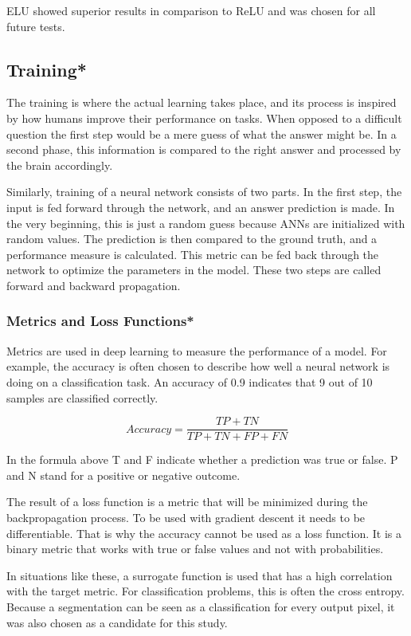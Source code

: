 ELU showed superior results in comparison to ReLU and was chosen for all future tests.

\subsection{Training*}

The training is where the actual learning takes place, and its process is inspired by how humans improve their performance on tasks. When opposed to a difficult question the first step would be a mere guess of what the answer might be. In a second phase, this information is compared to the right answer and processed by the brain accordingly.

Similarly, training of a neural network consists of two parts. In the first step, the input is fed forward through the network, and an answer prediction is made. In the very beginning, this is just a random guess because ANNs are initialized with random values. The prediction is then compared to the ground truth, and a performance measure is calculated. This metric can be fed back through the network to optimize the parameters in the model. These two steps are called forward and backward propagation.

\subsubsection{Metrics and Loss Functions*}

Metrics are used in deep learning to measure the performance of a model. For example, the accuracy is often chosen to describe how well a neural network is doing on a classification task. An accuracy of 0.9 indicates that 9 out of 10 samples are classified correctly.

\begin{equation}
Accuracy = \frac{TP+TN}{TP+TN+FP+FN}
\end{equation}

In the formula above T and F indicate whether a prediction was true or false. P and N stand for a positive or negative outcome.

The result of a loss function is a metric that will be minimized during the backpropagation process. To be used with gradient descent it needs to be differentiable. That is why the accuracy cannot be used as a loss function. It is a binary metric that works with true or false values and not with probabilities.

In situations like these, a surrogate function is used that has a high correlation with the target metric. For classification problems, this is often the cross entropy. Because a segmentation can be seen as a classification for every output pixel, it was also chosen as a candidate for this study.

